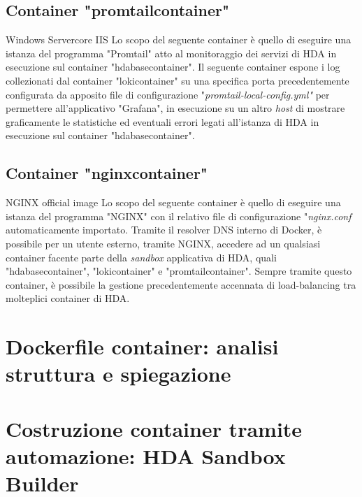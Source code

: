 \subsection{Container "promtailcontainer"}
\begin{namespacedesc}
	 {Windows Servercore IIS}
	 {Lo scopo del seguente container è quello di eseguire una istanza del programma "Promtail" atto al monitoraggio dei servizi di HDA in esecuzione sul container "hdabasecontainer". Il seguente container espone i log collezionati dal container "lokicontainer" su una specifica porta precedentemente configurata da apposito file di configurazione "\textit{promtail-local-config.yml"} per permettere all'applicativo "Grafana", in esecuzione su un altro \textit{host} di mostrare graficamente le statistiche ed eventuali errori legati all'istanza di HDA in esecuzione sul container "hdabasecontainer".}
\end{namespacedesc}	

\subsection{Container "nginxcontainer"}
\begin{namespacedesc}
	 {NGINX official image}
	 {Lo scopo del seguente container è quello di eseguire una istanza del programma "NGINX" con il relativo file di configurazione "\textit{nginx.conf} automaticamente importato. Tramite il resolver DNS interno di Docker, è possibile per un utente esterno, tramite NGINX, accedere ad un qualsiasi container facente parte della \textit{sandbox} applicativa di HDA, quali "hdabasecontainer", "lokicontainer" e "promtailcontainer". Sempre tramite questo container, è possibile la gestione precedentemente accennata di load-balancing tra molteplici container di HDA.}
\end{namespacedesc}	

\section{Dockerfile container: analisi struttura e spiegazione}


\section{Costruzione container tramite automazione: HDA Sandbox Builder}
